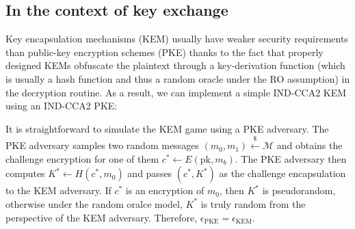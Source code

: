 \documentclass{article}
\newcommand{\leftsample}{\overset{{\scriptscriptstyle\$}}{\leftarrow}}
\begin{document}
\subsection{In the context of key exchange}
    Key encapsulation mechanisms (KEM) usually have weaker security requirements than public-key encryption schemes (PKE) thanks to the fact that properly designed KEMs obfuscate the plaintext through a key-derivation function (which is usually a hash function and thus a random oracle under the RO assumption) in the decryption routine. As a result, we can implement a simple IND-CCA2 KEM using an IND-CCA2 PKE:




    It is straightforward to simulate the KEM game using a PKE adversary. The PKE adversary samples two random messages $(m_0, m_1) \leftsample \mathcal{M}$ and obtains the challenge encryption for one of them $c^\ast \leftarrow E(\text{pk}, m_b)$. The PKE adversary then computes $K^\ast \leftarrow H(c^\ast, m_0)$ and passes $(c^\ast, K^\ast)$ as the challenge encapsulation to the KEM adversary. If $c^\ast$ is an encryption of $m_0$, then $K^\ast$ is pseudorandom, otherwise under the random oralce model, $K^\ast$ is truly random from the perspective of the KEM adversary. Therefore, $\epsilon_\text{PKE} = \epsilon_\text{KEM}$.
\end{document}
